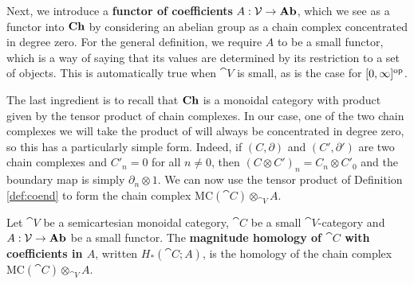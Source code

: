 Next, we introduce a \textbf{functor of coefficients} $A : \mathcal{V} \to \mathbf{Ab}$, which we see as a functor into $\mathbf{Ch}$ by considering an abelian group as a chain complex concentrated in degree zero. For the general definition, we require $A$ to be a small functor, which is a way of saying that its values are determined by its restriction to a set of objects. This is automatically true when $\cat{V}$ is small, as is the case for $[0,\infty]^{\mathrm{op}}$.

The last ingredient is to recall that $\mathbf{Ch}$ is a monoidal category with product given by the tensor product of chain complexes. In our case, one of the two chain complexes we will take the product of will always be concentrated in degree zero, so this has a particularly simple form. Indeed, if $(C, \partial)$ and $(C', \partial')$ are two chain complexes and $C'_n = 0$ for all $n \neq 0$, then $(C \otimes C')_n = C_n \otimes C'_0$ and the boundary map is simply $\partial_n \otimes 1$. We can now use the tensor product of Definition \ref{def:coend} to form the chain complex $\mathrm{MC}(\cat{C}) \otimes_{\cat{V}} A$.

\begin{definition}\label{def:mag_hom}
    Let $\cat{V}$ be a semicartesian monoidal category, $\cat{C}$ be a small $\cat{V}$-category and $A : \mathcal{V} \to \mathbf{Ab}$ be a small functor. The \textbf{magnitude homology of $\cat{C}$ with coefficients in $A$}, written $H_*(\cat{C}; A)$, is the homology of the chain complex $\mathrm{MC}(\cat{C}) \otimes_{\cat{V}} A$.
\end{definition}

